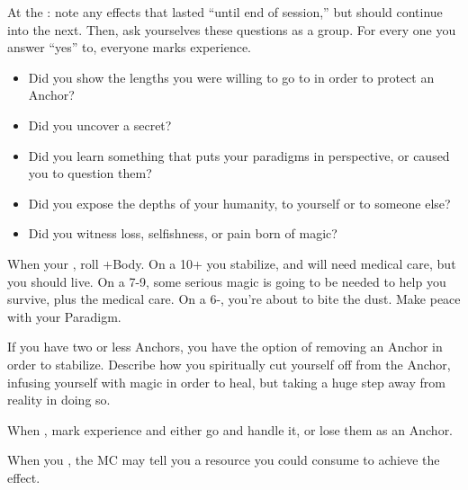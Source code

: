 \begin{multicols}{3}
  \begin{move}
    At the : note any effects that lasted
    ``until end of session,'' but should continue into the next. Then,
    ask yourselves these questions as a group. For every one you
    answer ``yes'' to, everyone marks experience.
    \begin{itemize}
      \setlength\itemsep{0em}
    \item Did you show the lengths you were willing to go to in order
      to protect an Anchor?
    \item Did you uncover a secret?
    \item Did you learn something that puts your paradigms in
      perspective, or caused you to question them?
    \item Did you expose the depths of your humanity, to yourself or
      to someone else?
    \item Did you witness loss, selfishness, or pain born of magic?
    \end{itemize}
  \end{move}

  \SEPARATOR
  
  \begin{move}
    When your , roll +Body. On a 10+ you
    stabilize, and will need medical care, but you should live. On a
    7-9, some serious magic is going to be needed to help you survive,
    plus the medical care. On a 6-, you're about to bite the
    dust. Make peace with your Paradigm.

    If you have two or less Anchors, you have the option of removing
    an Anchor in order to stabilize. Describe how you spiritually cut
    yourself off from the Anchor, infusing yourself with magic in
    order to heal, but taking a huge step away from reality in doing
    so.
  \end{move}

  \SEPARATOR

  \begin{move}
    When , mark
    experience and either go and handle it, or lose them as an
    Anchor.
  \end{move}

  \SEPARATOR

  \begin{move}
    When you , the MC may tell you a
    resource you could consume to achieve the effect.
  \end{move}

\end{multicols}

